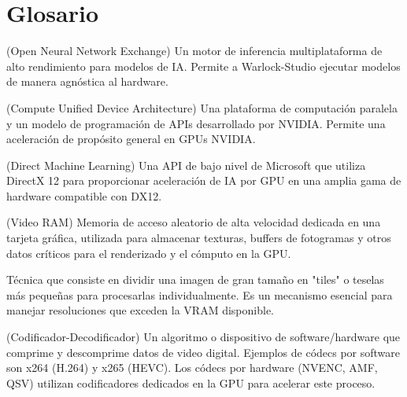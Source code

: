 \documentclass[11pt, a4paper]{article}
\newcommand{\SectionColor}{WarlockGray} %
\newcommand{\setsectioncolor}[1]{\renewcommand{\SectionColor}{#1}}
\begin{document}
\section{Glosario}
\begin{description}[leftmargin=*, style=nextline, itemsep=0.8em]
    \item[ONNX Runtime] (Open Neural Network Exchange) Un motor de inferencia multiplataforma de alto rendimiento para modelos de IA. Permite a Warlock-Studio ejecutar modelos de manera agnóstica al hardware.
    \item[CUDA] (Compute Unified Device Architecture) Una plataforma de computación paralela y un modelo de programación de APIs desarrollado por NVIDIA. Permite una aceleración de propósito general en GPUs NVIDIA.
    \item[DirectML] (Direct Machine Learning) Una API de bajo nivel de Microsoft que utiliza DirectX 12 para proporcionar aceleración de IA por GPU en una amplia gama de hardware compatible con DX12.
    \item[VRAM] (Video RAM) Memoria de acceso aleatorio de alta velocidad dedicada en una tarjeta gráfica, utilizada para almacenar texturas, buffers de fotogramas y otros datos críticos para el renderizado y el cómputo en la GPU.
    \item[Tiling] Técnica que consiste en dividir una imagen de gran tamaño en "tiles" o teselas más pequeñas para procesarlas individualmente. Es un mecanismo esencial para manejar resoluciones que exceden la VRAM disponible.
    \item[Códec] (Codificador-Decodificador) Un algoritmo o dispositivo de software/hardware que comprime y descomprime datos de video digital. Ejemplos de códecs por software son x264 (H.264) y x265 (HEVC). Los códecs por hardware (NVENC, AMF, QSV) utilizan codificadores dedicados en la GPU para acelerar este proceso.
\end{description}

\setsectioncolor{SupportColor}
\end{document}

